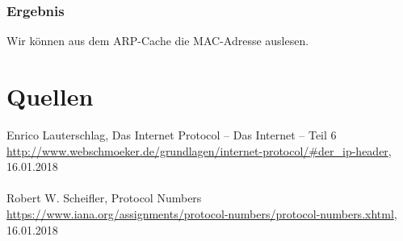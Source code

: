 \subsubsection{Ergebnis}

Wir können aus dem ARP-Cache die MAC-Adresse auslesen.


\section{Quellen}
\begin{thebibliography}{999}
 Enrico Lauterschlag, Das Internet Protocol – Das Internet – Teil 6 \\ \url{http://www.webschmoeker.de/grundlagen/internet-protocol/#der_ip-header}, 16.01.2018 \\
\\
 Robert W. Scheifler, Protocol Numbers \\ \url{https://www.iana.org/assignments/protocol-numbers/protocol-numbers.xhtml}, 16.01.2018

\end{thebibliography}




